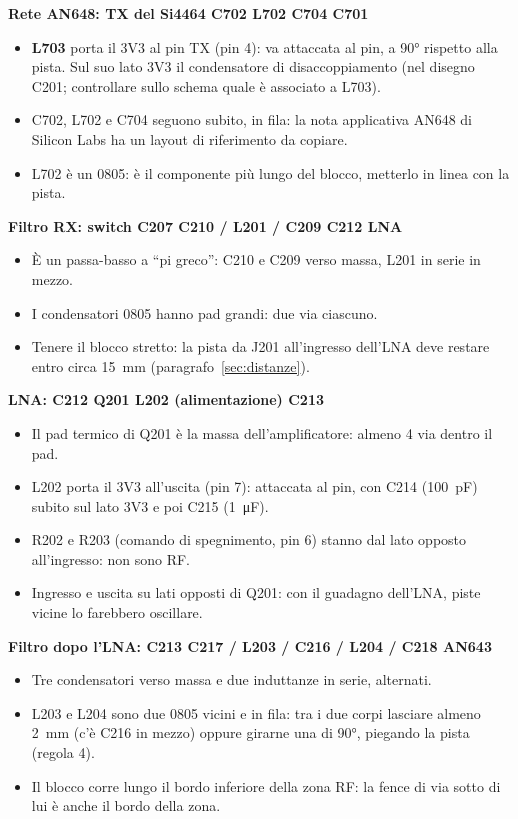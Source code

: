 \documentclass[a4paper,11pt]{article}
\newcommand{\blocco}[3]{%
  \par\medskip\noindent\begin{minipage}{\linewidth}
  {\sffamily\bfseries\color{sbblue}#1}\par\smallskip
  \centering\par\smallskip
  \raggedright\small #3
  \end{minipage}\par\medskip}
\begin{document}
\blocco{Rete AN648: TX del Si4464 \textrightarrow{} C702 \textrightarrow{} L702 \textrightarrow{} C704 \textrightarrow{} C701}{blk_an648}{%
\begin{itemize}[nosep]
\item \textbf{L703} porta il 3V3 al pin TX (pin 4): va attaccata al pin, a \ang{90} rispetto alla pista. Sul suo lato 3V3 il condensatore di disaccoppiamento (nel disegno C201; controllare sullo schema quale è associato a L703).
\item C702, L702 e C704 seguono subito, in fila: la nota applicativa AN648 di Silicon Labs ha un layout di riferimento da copiare.
\item L702 è un 0805: è il componente più lungo del blocco, metterlo in linea con la pista.
\end{itemize}}

\blocco{Filtro RX: switch \textrightarrow{} C207 \textrightarrow{} C210 / L201 / C209 \textrightarrow{} C212 \textrightarrow{} LNA}{blk_filtro_rx}{%
\begin{itemize}[nosep]
\item È un passa-basso a \enquote{pi greco}: C210 e C209 verso massa, L201 in serie in mezzo.
\item I condensatori 0805 hanno pad grandi: due via ciascuno.
\item Tenere il blocco stretto: la pista da J201 all'ingresso dell'LNA deve restare entro circa \SI{15}{mm} (paragrafo~\ref{sec:distanze}).
\end{itemize}}

\blocco{LNA: C212 \textrightarrow{} Q201 \textrightarrow{} L202 (alimentazione) \textrightarrow{} C213}{blk_lna}{%
\begin{itemize}[nosep]
\item Il pad termico di Q201 è la massa dell'amplificatore: almeno 4 via dentro il pad.
\item L202 porta il 3V3 all'uscita (pin 7): attaccata al pin, con C214 (\SI{100}{pF}) subito sul lato 3V3 e poi C215 (\SI{1}{\micro F}).
\item R202 e R203 (comando di spegnimento, pin 6) stanno dal lato opposto all'ingresso: non sono RF.
\item Ingresso e uscita su lati opposti di Q201: con il guadagno dell'LNA, piste vicine lo farebbero oscillare.
\end{itemize}}

\blocco{Filtro dopo l'LNA: C213 \textrightarrow{} C217 / L203 / C216 / L204 / C218 \textrightarrow{} AN643}{blk_post_lna}{%
\begin{itemize}[nosep]
\item Tre condensatori verso massa e due induttanze in serie, alternati.
\item L203 e L204 sono due 0805 vicini e in fila: tra i due corpi lasciare almeno \SI{2}{mm} (c'è C216 in mezzo) oppure girarne una di \ang{90}, piegando la pista (regola 4).
\item Il blocco corre lungo il bordo inferiore della zona RF: la fence di via sotto di lui è anche il bordo della zona.
\end{itemize}}
\end{document}
